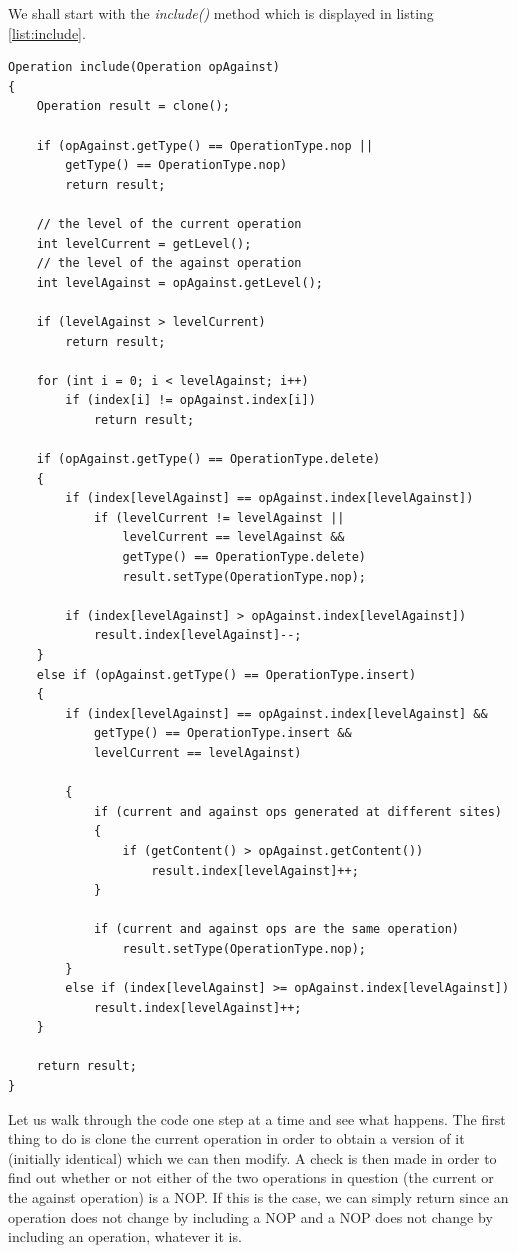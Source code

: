 We shall start with the \emph{include()} method which is displayed in listing \ref{list:include}.

\begin{lstlisting}[frame=lines,float=p,caption=include operation,label=list:include]
Operation include(Operation opAgainst)
{
	Operation result = clone();

	if (opAgainst.getType() == OperationType.nop ||
		getType() == OperationType.nop)
		return result;

	// the level of the current operation
	int levelCurrent = getLevel();
	// the level of the against operation
	int levelAgainst = opAgainst.getLevel();

	if (levelAgainst > levelCurrent)
		return result;

	for (int i = 0; i < levelAgainst; i++)
		if (index[i] != opAgainst.index[i])
			return result;

	if (opAgainst.getType() == OperationType.delete)
	{
		if (index[levelAgainst] == opAgainst.index[levelAgainst])
			if (levelCurrent != levelAgainst ||
				levelCurrent == levelAgainst &&
				getType() == OperationType.delete)
				result.setType(OperationType.nop);

		if (index[levelAgainst] > opAgainst.index[levelAgainst])
			result.index[levelAgainst]--;
	}
	else if (opAgainst.getType() == OperationType.insert)
	{
		if (index[levelAgainst] == opAgainst.index[levelAgainst] &&
			getType() == OperationType.insert &&
			levelCurrent == levelAgainst)
			
		{
			if (current and against ops generated at different sites)
			{
				if (getContent() > opAgainst.getContent())
					result.index[levelAgainst]++;
			}

			if (current and against ops are the same operation)
				result.setType(OperationType.nop);
		}
		else if (index[levelAgainst] >= opAgainst.index[levelAgainst])
			result.index[levelAgainst]++;
	}

	return result;
}
\end{lstlisting}

Let us walk through the code one step at a time and see what happens. The first
thing to do is clone the current operation in order to obtain a version of it
(initially identical) which we can then modify. A check is then made in order to
find out whether or not either of the two operations in question (the current or
the against operation) is a NOP. If this is the case, we can simply return since
an operation does not change by including a NOP and a NOP does not change by
including an operation, whatever it is.

